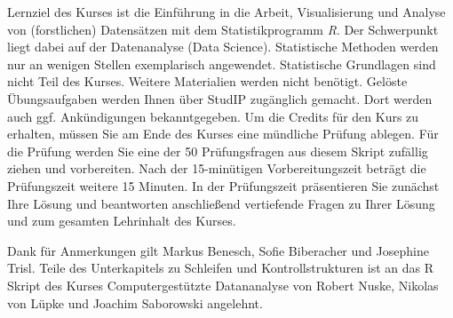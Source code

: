 \begin{titlepage}
Lernziel des Kurses ist die Einführung in die Arbeit, Visualisierung und Analyse von (forstlichen) Datensätzen
mit dem Statistikprogramm \textit{R}. Der Schwerpunkt liegt dabei auf der Datenanalyse (Data Science). Statistische Methoden werden nur an wenigen Stellen exemplarisch angewendet. Statistische Grundlagen sind nicht Teil des Kurses. Weitere Materialien werden nicht benötigt. Gelöste Übungsaufgaben werden Ihnen über StudIP zugänglich gemacht. Dort werden auch ggf. Ankündigungen bekanntgegeben. Um die Credits für den Kurs zu erhalten, müssen Sie am Ende des Kurses eine mündliche Prüfung ablegen. Für die Prüfung werden Sie eine der 50 Prüfungsfragen aus diesem Skript zufällig ziehen und vorbereiten. Nach der 15-minütigen Vorbereitungszeit beträgt die Prüfungszeit weitere 15 Minuten. In der Prüfungszeit präsentieren Sie zunächst Ihre Lösung und beantworten anschließend vertiefende Fragen zu Ihrer Lösung und zum gesamten Lehrinhalt des Kurses.

Dank für Anmerkungen gilt Markus Benesch, Sofie Biberacher und Josephine Trisl.
Teile des Unterkapitels zu Schleifen und Kontrollstrukturen ist an das R Skript des Kurses Computergestützte Datananalyse von Robert Nuske, Nikolas von Lüpke und Joachim Saborowski angelehnt.
\end{titlepage}

